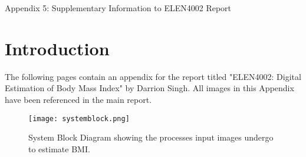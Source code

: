 \documentclass[conference]{IEEEtran}
\begin{document}
\onecolumn
\begin{center}
\LARGE Appendix 5: Supplementary Information to ELEN4002 Report
\end{center}
\section{Introduction}
The following pages contain an appendix for the report titled "ELEN4002: Digital Estimation of Body Mass Index" by Darrion Singh.
All images in this Appendix have been referenced in the main report.
\begin{figure}[h]
    \centering
    \texttt{[image: systemblock.png]}
    \caption{System Block Diagram showing the processes input images undergo to estimate BMI.}
    \label{fig:systemblockdiagram}
\end{figure}
\end{document}
